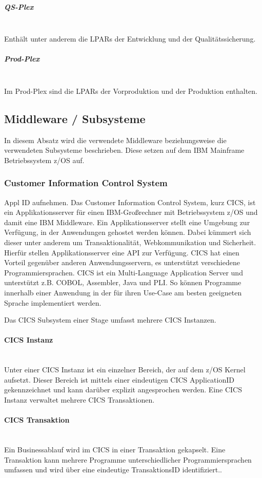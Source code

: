 \subparagraph{\glqq QS-Plex\grqq}~\\
Enthält unter anderem die LPARs der Entwicklung und der Qualitätssicherung.

\subparagraph{\glqq Prod-Plex\grqq}~\\
Im Prod-Plex sind die LPARs der Vorproduktion und der Produktion enthalten.

\subsection{Middleware / Subsysteme}
In diesem Absatz wird die verwendete Middleware beziehungsweise die verwendeten Subsysteme beschrieben.
Diese setzen auf dem IBM Mainframe Betriebssystem z/OS auf.

\subsubsection{Customer Information Control System}\label{cics} Appl ID aufnehmen.
Das Customer Information Control System, kurz CICS, ist ein Applikationsserver für einen IBM-Großrechner mit Betriebssystem z/OS und damit eine IBM Middleware.
Ein Applikationsserver stellt eine Umgebung zur Verfügung, in der Anwendungen gehostet werden können.
Dabei kümmert sich dieser unter anderem um Transaktionalität, Webkommunikation und Sicherheit.
Hierfür stellen Applikationsserver eine API zur Verfügung.
CICS hat einen Vorteil gegenüber anderen Anwendungsservern, es unterstützt verschiedene Programmiersprachen.
CICS ist ein Multi-Language Application Server und unterstützt z.B. COBOL, Assembler, Java und PLI.
So können Programme innerhalb einer Anwendung in der für ihren Use-Case am besten geeigneten Sprache implementiert werden.
\cite{Rayns.2011}

Das CICS Subsystem einer Stage umfasst mehrere CICS Instanzen.

\paragraph{CICS Instanz} ~\\
Unter einer CICS Instanz ist ein einzelner Bereich, der auf dem z/OS Kernel aufsetzt.
Dieser Bereich ist mittels einer eindeutigen CICS ApplicationID gekennzeichnet und kann darüber explizit angesprochen werden.
Eine CICS Instanz verwaltet mehrere CICS Transaktionen.

\paragraph{CICS Transaktion}\label{subsec:trans} ~\\
Ein Businessablauf wird im CICS in einer Transaktion gekapselt.
Eine Transaktion kann mehrere Programme unterschiedlicher Programmiersprachen umfassen und wird über eine eindeutige \glqq TransaktionsID\grqq{} identifiziert..

